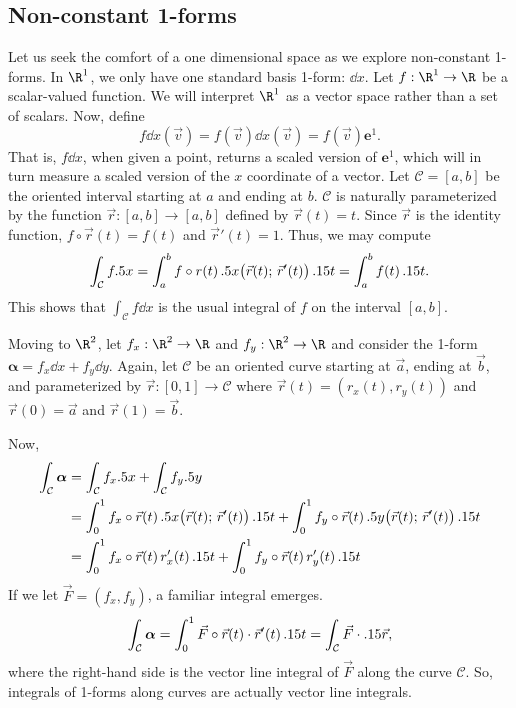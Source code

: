 \subsection{Non-constant 1-forms}

Let us seek the comfort of a one dimensional space as we explore non-constant 1-forms.
In $\R^1$, we only have one standard basis 1-form: $\dd x$.
Let $f:\R^1\to\R$ be a scalar-valued function.  We will interpret
$\R^1$ as a vector space rather than a set of scalars. Now, define
\[
	f\dd x (\vec v) = f(\vec v)\dd x(\vec v) = f(\vec v)\bm e^1.
\]
That is, $f\dd x$, when given a point, returns a scaled version of $\bm e^1$,
which will in turn measure a scaled version of the $x$ coordinate of
a vector.  Let $\mathcal C=[a,b]$ be the oriented interval starting
at $a$ and ending at $b$.  $\mathcal C$ is naturally parameterized
by the function $\vec r:[a,b]\to[a,b]$ defined by $\vec r(t) = t$.
Since $\vec r$ is the identity function, $f\circ \vec r(t)=f(t)$ and
$\vec r'(t) = 1$.
Thus, we may compute
\[
	\int_{\mathcal C} f.5 x = \int_a^b f\circ r(t)\, .5 x\big(\vec r(t);\, \vec r'(t)\big)
	\,.15 t
	=\int_a^b f(t)\,.15 t.
\]
This shows that
$\int_{\mathcal C} f\dd x$ is the usual integral of $f$ on the interval $[a,b]$.

\bigskip
Moving to $\R^2$, let $f_x:\R^2\to\R$ and $f_y:\R^2\to\R$
and consider the 1-form $\bm\alpha = f_x\dd x+f_y\dd y$.  Again, let
$\mathcal C$ be an oriented curve starting at $\vec a$, ending at $\vec b$,
and parameterized by $\vec r:[0,1]\to\mathcal C$  where
$\vec r(t) = (r_x(t),r_y(t))$ and  $\vec r(0)=\vec a$ and
$\vec r(1)=\vec b$. 

Now,
\begin{align*}
	\int_{\mathcal C} \bm\alpha &= 
	\int_{\mathcal C} f_x.5 x+\int_{\mathcal C} f_y.5 y\\
	&=\int_0^1 f_x\circ \vec r(t)\, .5 x\big(\vec r(t);\, \vec r'(t)\big)\,.15 t
	+\int_0^1 f_y\circ \vec r(t)\, .5 y\big(\vec r(t);\, \vec r'(t)\big)\,.15 t\\
	&= \int_0^1 f_x\circ \vec r(t)\, r_x'(t)\,.15 t
	+\int_0^1 f_y\circ \vec r(t)\, r_y'(t)\,.15 t
\end{align*}
If we let $\vec F = (f_x,f_y)$, a familiar integral emerges.
\[
	\int_{\mathcal C} \bm\alpha = \int_0^1 \vec F\circ \vec r(t) \cdot \vec r'(t)\,.15 t
	=\int_{\mathcal C} \vec F\cdot .15\vec r,
\]
where the right-hand side is the vector line integral of $\vec F$ along the curve
$\mathcal C$.  So, integrals of 1-forms along curves are actually vector line
integrals.

